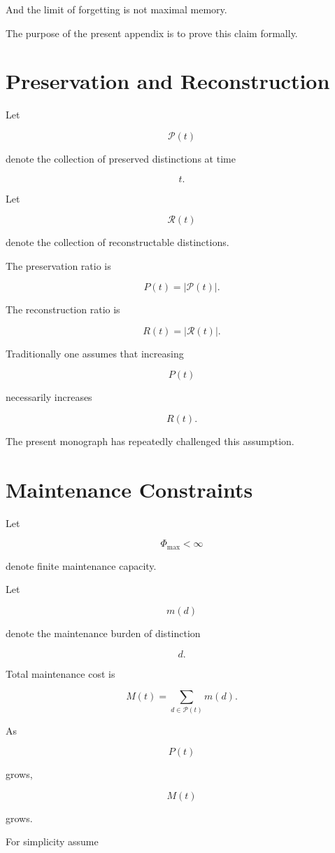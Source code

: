 \documentclass[12pt,oneside]{book}
\theoremstyle{plain} \newtheorem{theorem}{Theorem}[chapter] \newtheorem{lemma}[theorem]{Lemma} \newtheorem{proposition}[theorem]{Proposition} \newtheorem{corollary}[theorem]{Corollary}
\theoremstyle{definition} \newtheorem{definition}[theorem]{Definition} \newtheorem{axiom}[theorem]{Axiom} \newtheorem{construction}[theorem]{Construction}
\theoremstyle{remark} \newtheorem{remark}[theorem]{Remark} \newtheorem{example}[theorem]{Example}
\begin{document}
And the limit of forgetting is not maximal memory.

The purpose of the present appendix is to prove this claim formally.

\section{Preservation and Reconstruction}

Let

\[
\mathcal P(t)
\]

denote the collection of preserved distinctions at time

\[
t.
\]

Let

\[
\mathcal R(t)
\]

denote the collection of reconstructable distinctions.

The preservation ratio is

\[
P(t)
=
|\mathcal P(t)|.
\]

The reconstruction ratio is

\[
R(t)
=
|\mathcal R(t)|.
\]

Traditionally one assumes that increasing

\[
P(t)
\]

necessarily increases

\[
R(t).
\]

The present monograph has repeatedly challenged this assumption.

\section{Maintenance Constraints}

Let

\[
\Phi_{\max}
<
\infty
\]

denote finite maintenance capacity.

Let

\[
m(d)
\]

denote the maintenance burden of distinction

\[
d.
\]

Total maintenance cost is

\[
M(t)
=
\sum_{d\in\mathcal P(t)}
m(d).
\]

As

\[
P(t)
\]

grows,

\[
M(t)
\]

grows.

For simplicity assume
\end{document}
